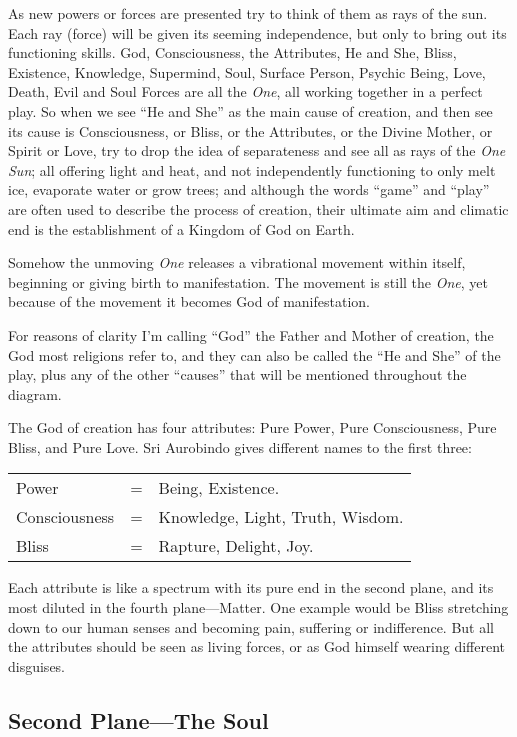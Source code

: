 \documentclass[12pt,a4paper]{book}
\begin{document}
As new powers or forces are presented try to think of them as rays of
the sun. Each ray (force) will be given its seeming independence, but
only to bring out its functioning skills. God, Consciousness, the
Attributes, He and She, Bliss, Existence, Knowledge, Supermind, Soul,
Surface Person, Psychic Being, Love, Death, Evil and Soul Forces are
all the \emph{One}, all working together in a perfect play. So when we see
``He and She'' as the main cause of creation, and then see its cause
is Consciousness, or Bliss, or the Attributes, or the Divine Mother,
or Spirit or Love, try to drop the idea of separateness and see all as
rays of the \emph{One Sun}; all offering light and heat, and not
independently functioning to only melt ice, evaporate water or grow
trees; and although the words ``game'' and ``play'' are often used to
describe the process of creation, their ultimate aim and climatic end
is the establishment of a Kingdom of God on Earth.

Somehow the unmoving \emph{One} releases a vibrational movement within
itself, beginning or giving birth to manifestation. The movement is
still the \emph{One}, yet because of the movement it becomes God of
manifestation.

For reasons of clarity I'm calling ``God'' the Father and Mother of
creation, the God most religions refer to, and they can also be called
the ``He and She'' of the play, plus any of the other ``causes'' that
will be mentioned throughout the diagram.

The God of creation has four attributes: Pure Power, Pure
Consciousness, Pure Bliss, and Pure Love. Sri Aurobindo gives
different names to the first three:

\begin{tabular}{lcl}
Power 		& = & Being, Existence.\\
Consciousness   & = & Knowledge, Light, Truth, Wisdom.\\
Bliss		& = & Rapture, Delight, Joy.
\end{tabular}

Each attribute is like a spectrum with its pure end in the second
plane, and its most diluted in the fourth plane---Matter. One example
would be Bliss stretching down to our human senses and becoming pain,
suffering or indifference. But all the attributes should be seen as
living forces, or as God himself wearing different disguises.


\newpage
\begin{center}\section*{Second Plane---The Soul}\end{center}
\end{document}
